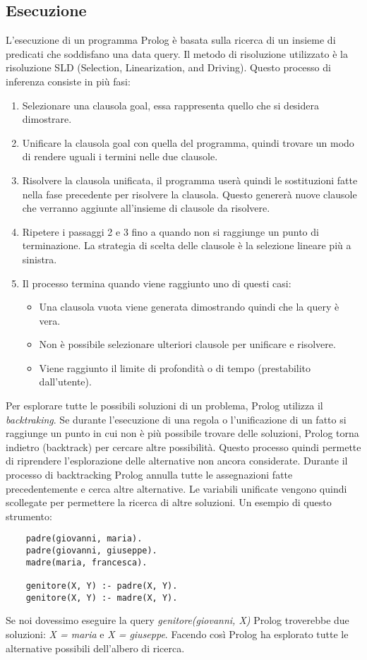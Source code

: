 \subsection{Esecuzione}
\label{subsec:esecuzione}
L'esecuzione di un programma Prolog è basata sulla ricerca di un insieme di predicati che soddisfano una data query. Il metodo di risoluzione utilizzato è la risoluzione SLD (Selection, Linearization, and Driving).
Questo processo di inferenza consiste in più fasi:
\begin{enumerate}
    \item Selezionare una clausola goal, essa rappresenta quello che si desidera dimostrare.
    \item Unificare la clausola goal con quella del programma, quindi trovare un modo di rendere uguali i termini nelle due clausole.
    \item Risolvere la clausola unificata, il programma userà quindi le sostituzioni fatte nella fase precedente per risolvere la clausola. Questo genererà nuove clausole che verranno aggiunte all'insieme di clausole da risolvere.
    \item Ripetere i passaggi 2 e 3 fino a quando non si raggiunge un punto di terminazione. La strategia di scelta delle clausole  è la selezione lineare più a sinistra.
    \item Il processo termina quando viene raggiunto uno di questi casi:
    \begin{itemize}
        \item Una clausola vuota viene generata dimostrando quindi che la query è vera.
        \item Non è possibile selezionare ulteriori clausole per unificare e risolvere.
        \item Viene raggiunto il limite di profondità o di tempo (prestabilito dall'utente).
    \end{itemize}
\end{enumerate}
Per esplorare tutte le possibili soluzioni di un problema, Prolog utilizza il \textit{backtraking}. Se durante l'esecuzione di una 
regola o l'unificazione di un fatto si raggiunge un punto in cui non è più possibile trovare delle soluzioni, Prolog torna indietro (backtrack)
per cercare altre possibilità. Questo processo quindi permette di riprendere l'esplorazione delle alternative non ancora considerate.
Durante il processo di backtracking Prolog annulla tutte le assegnazioni fatte precedentemente e cerca altre alternative. Le variabili unificate vengono quindi scollegate
per permettere la ricerca di altre soluzioni. Un esempio di questo strumento:
\begin{verbatim}
    padre(giovanni, maria).
    padre(giovanni, giuseppe).
    madre(maria, francesca).

    genitore(X, Y) :- padre(X, Y).
    genitore(X, Y) :- madre(X, Y).
\end{verbatim}
Se noi dovessimo eseguire la query \textit{genitore(giovanni, X)} Prolog troverebbe due soluzioni: \textit{X = maria} e \textit{X = giuseppe}. 
Facendo così Prolog ha esplorato tutte le alternative possibili dell'albero di ricerca. 
